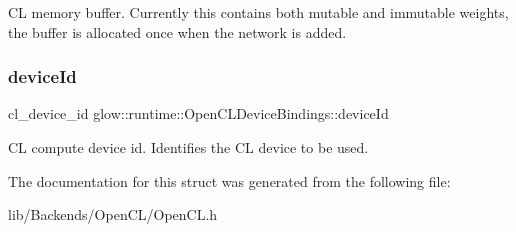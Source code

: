 CL memory buffer. Currently this contains both mutable and immutable weights, the buffer is allocated once when the network is added. \mbox{\label{structglow_1_1runtime_1_1_open_c_l_device_bindings_a0b952fbbf354b67bb73de2626d5a6e6c}} 
\subsubsection{\texorpdfstring{device\+Id}{deviceId}}
{\footnotesize\ttfamily cl\+\_\+device\+\_\+id glow\+::runtime\+::\+Open\+C\+L\+Device\+Bindings\+::device\+Id}

CL compute device id. Identifies the CL device to be used. 

The documentation for this struct was generated from the following file\+:\begin{DoxyCompactItemize}
\item 
lib/\+Backends/\+Open\+C\+L/Open\+C\+L.\+h\end{DoxyCompactItemize}

